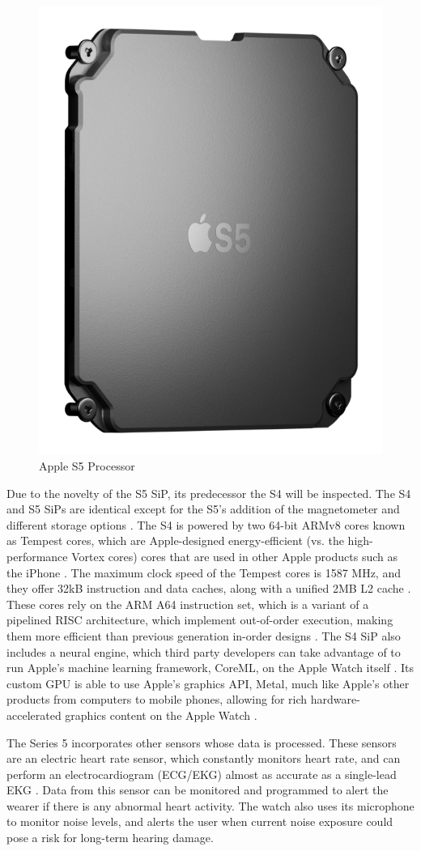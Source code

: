 \begin{figure}[h]
    \centering
    \includegraphics[width=.15\linewidth]{media/apple_s5_chip.png}
    \caption{Apple S5 Processor \cite{apple_s5_pic}}
    \label{fig:s5chip}
\end{figure}

Due to the novelty of the S5 SiP, its predecessor the S4 will be inspected. The S4 and
S5 SiPs are identical except for the S5's addition of the magnetometer and different
storage options \cite{s5vss4}. The S4 is powered by two 64-bit ARMv8 cores known as Tempest
cores, which are Apple-designed energy-efficient (vs. the high-performance Vortex cores)
cores that are used in other Apple products such as the iPhone \cite{s4_cores}. The maximum clock
speed of the Tempest cores is 1587 MHz, and they offer 32kB instruction and data caches,
along with a unified 2MB L2 cache \cite{tempest_stats}.
These cores rely on the ARM A64 instruction set, which is a variant of a pipelined RISC 
architecture, which implement out-of-order execution, making them more efficient
than previous generation in-order designs \cite{arm_risc}. The S4 SiP also includes a
neural engine, which third party developers can take advantage of to run Apple's machine
learning framework, CoreML, on the Apple Watch itself \cite{core_ml}. Its custom GPU
is able to use Apple's graphics API, Metal, much like Apple's other products from computers
to mobile phones, allowing for rich hardware-accelerated graphics content on the 
Apple Watch \cite{watch_metal}.

The Series 5 incorporates other sensors whose data is processed. These sensors are an electric
heart rate sensor, which constantly monitors heart rate, and can perform an electrocardiogram 
(ECG/EKG) almost as accurate as a single-lead EKG \cite{apple_health}. Data from this sensor can
be monitored and programmed to alert the wearer if there is any abnormal heart activity. The watch
also uses its microphone to monitor noise levels, and alerts the user when current noise exposure could
pose a risk for long-term hearing damage. 

